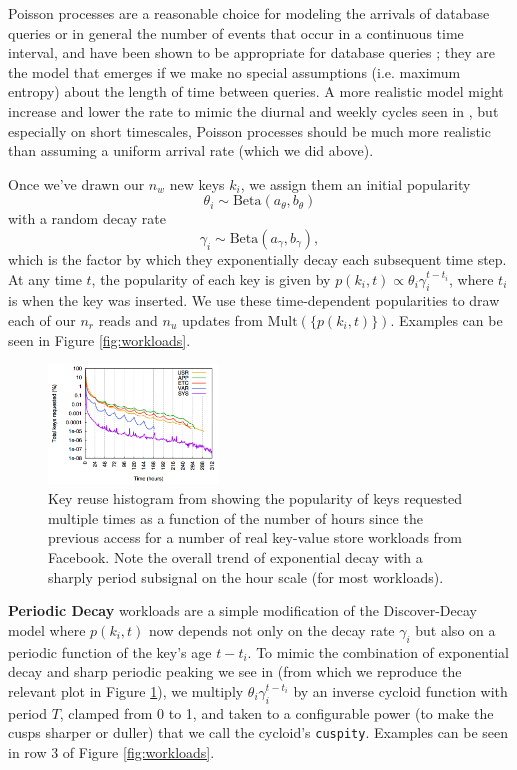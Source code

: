 \documentclass{sig-alternate-05-2015}
\begin{document}
Poisson processes are a reasonable choice for modeling the arrivals of database
queries or in general the number of events that occur in a continuous time
interval, and have been shown to be appropriate for database queries
\cite{poisson-db1,poisson-db2,poisson-db3}; they are the model that emerges
if we make no special assumptions (i.e. maximum entropy) about the
length of time between queries.  A more realistic model might increase and
lower the rate to mimic the diurnal and weekly cycles seen in
\cite{characterizing-memcached}, but especially on short timescales, Poisson
processes should be much more realistic than assuming a uniform arrival rate
(which we did above).

Once we've drawn our $n_w$ new keys $k_i$, we assign them an initial popularity
$$
\theta_{i} \sim \textrm{Beta}(a_\theta,b_\theta)
$$
\noindent with a random decay rate
$$
\gamma_i \sim \textrm{Beta}(a_\gamma,b_\gamma),
$$
which is the factor by which they exponentially decay each subsequent time
step. At any time $t$, the popularity of each key is given by $p(k_i,t) \propto
\theta_i\gamma_i^{t-t_i}$, where $t_i$ is when the key was inserted. We use
these time-dependent popularities to draw each of our $n_r$ reads and $n_u$
updates from $\textrm{Mult}(\{p(k_i,t)\})$. Examples can be seen in Figure
\ref{fig:workloads}.

\begin{figure}[!htb]
\begin{center}
\includegraphics[width=0.4\textwidth]{cuspity.png}
\end{center}
\caption{Key reuse histogram from \cite{characterizing-memcached} showing the
  popularity of keys requested multiple times as a function of the number of
  hours since the previous access for a number of real key-value store
  workloads from Facebook. Note the overall trend of exponential decay with a
  sharply period subsignal on the hour scale (for most workloads).}
\label{fig:memcached-decay}
\end{figure}

\textbf{Periodic Decay} workloads are a simple modification of the
Discover-Decay model where $p(k_i,t)$ now depends not only on the decay rate
$\gamma_i$ but also on a periodic function of the key's age $t-t_i$.  To mimic
the combination of exponential decay and sharp periodic peaking we see in
\cite{characterizing-memcached} (from which we reproduce the relevant plot in
Figure \ref{fig:memcached-decay}), we multiply $\theta_i\gamma_i^{t-t_i}$ by an
inverse cycloid function with period $T$, clamped from 0 to 1, and taken to a
configurable power (to make the cusps sharper or duller) that we call the
cycloid's \texttt{cuspity}. Examples can be seen in row 3 of Figure
\ref{fig:workloads}.
\end{document}
